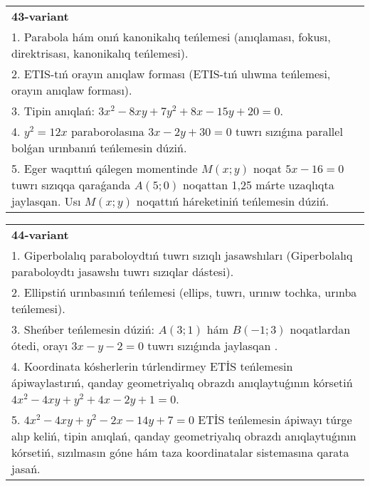 \documentclass{article}
\begin{document}
\begin{tabular}{m{17cm}}
\textbf{43-variant}\\
1. Parabola hám onıń kanonikalıq teńlemesi (anıqlaması, fokusı, direktrisası, kanonikalıq teńlemesi).\\

2. ETIS-tıń orayın anıqlaw forması (ETIS-tıń ulıwma teńlemesi, orayın anıqlaw forması).\\

3. Tipin anıqlań: $3 x^{2}-8 xy+7 y^{2}+8 x-15 y+20=0$.\\

4. $y^{2} = 12x$ paraborolasına $3x - 2y + 30 = 0$ tuwrı sızıǵına parallel bolǵan urınbanıń teńlemesin dúziń.  \\

5. Eger waqıttıń qálegen momentinde $M(x;y)$ noqat $5x - 16 = 0$ tuwrı sızıqqa qaraǵanda $A(5;0)$ noqattan 1,25 márte uzaqlıqta jaylasqan. Usı $M(x;y)$ noqattıń háreketiniń teńlemesin dúziń.  
\end{tabular}
\vspace{1cm}


\begin{tabular}{m{17cm}}
\textbf{44-variant}\\
1. Giperbolalıq paraboloydtıń tuwrı sızıqlı jasawshıları (Giperbolalıq paraboloydtı jasawshı tuwrı sızıqlar dástesi).\\

2. Ellipstiń urınbasınıń teńlemesi (ellips, tuwrı, urınıw tochka, urınba teńlemesi).\\

3. Sheńber teńlemesin dúziń: $A (3;1) $ hám $B (-1;3) $ noqatlardan ótedi, orayı $3 x-y-2=0$ tuwrı sızıǵında jaylasqan .\\

4. Koordinata kósherlerin túrlendirmey ETİS teńlemesin ápiwaylastırıń, qanday geometriyalıq obrazdı anıqlaytuǵının kórsetiń $4x^{2} - 4xy + y^{2} + 4x - 2y + 1 = 0$.  \\

5. $4x^{2} - 4xy + y^{2} - 2x - 14y + 7 = 0$ ETİS teńlemesin ápiwayı túrge alıp keliń, tipin anıqlań, qanday geometriyalıq obrazdı anıqlaytuǵının kórsetiń, sızılmasın góne hám taza koordinatalar sistemasına qarata jasań.  
\end{tabular}
\vspace{1cm}
\end{document}
